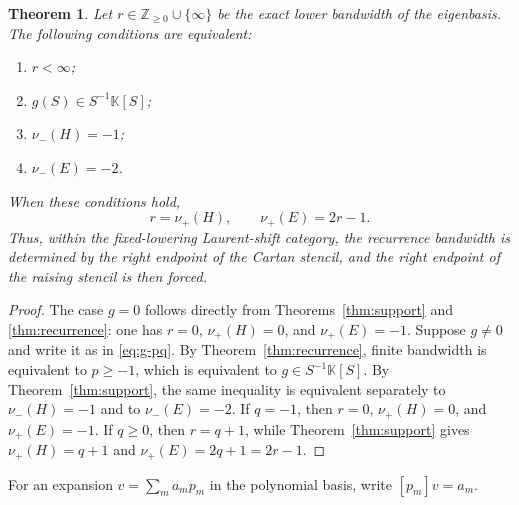 \documentclass[11pt,reqno]{amsart}
\numberwithin{equation}{section}
\newtheorem{theorem}{Theorem}[section]
\theoremstyle{definition}
\theoremstyle{remark}
\newcommand{\K}{\mathbb K}
\newcommand{\Z}{\mathbb Z}
\begin{document}
\begin{theorem}\label{thm:numerical-bandwidth}
Let $r\in\Z_{\ge0}\cup\{\infty\}$ be the exact lower bandwidth of the eigenbasis.  The following conditions are equivalent:
\begin{enumerate}[label=\textup{(\roman*)},leftmargin=2.3em]
\item $r<\infty$;
\item $g(S)\in S^{-1}\K[S]$;
\item $\nu_-(H)=-1$;
\item $\nu_-(E)=-2$.
\end{enumerate}
When these conditions hold,
\begin{equation}\label{eq:numerical-bandwidth}
 r=\nu_+(H),
 \qquad
 \nu_+(E)=2r-1.
\end{equation}
Thus, within the fixed-lowering Laurent-shift category, the recurrence bandwidth is determined by the right endpoint of the Cartan stencil, and the right endpoint of the raising stencil is then forced.
\end{theorem}

\begin{proof}
The case $g=0$ follows directly from Theorems~\ref{thm:support} and \ref{thm:recurrence}: one has $r=0$, $\nu_+(H)=0$, and $\nu_+(E)=-1$.  Suppose $g\ne0$ and write it as in \eqref{eq:g-pq}.  By Theorem~\ref{thm:recurrence}, finite bandwidth is equivalent to $p\ge-1$, which is equivalent to $g\in S^{-1}\K[S]$.  By Theorem~\ref{thm:support}, the same inequality is equivalent separately to $\nu_-(H)=-1$ and to $\nu_-(E)=-2$.  If $q=-1$, then $r=0$, $\nu_+(H)=0$, and $\nu_+(E)=-1$.  If $q\ge0$, then $r=q+1$, while Theorem~\ref{thm:support} gives $\nu_+(H)=q+1$ and $\nu_+(E)=2q+1=2r-1$.
\end{proof}

For an expansion $v=\sum_m a_mp_m$ in the polynomial basis, write $[p_m]v=a_m$.
\end{document}
